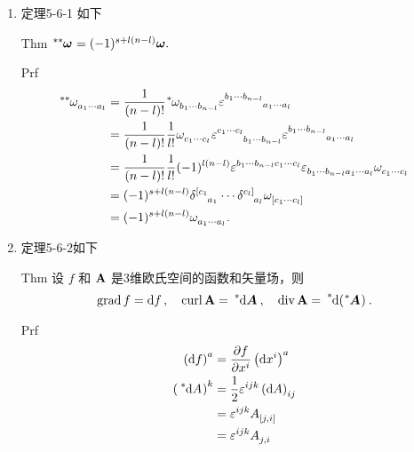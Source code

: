 \begin{xiti}
	\begin{zm}
		\begin{enumerate}
			\item 定理5-6-1 如下
			\begin{yl}{Thm}
				$\tensor[^*^*]{\bm{\omega}}{} = (-1)^{s+l(n-l)} \bm{\omega}. $
			\end{yl}
		    \begin{yl}{Prf}
		    	\begin{align*}
		    	\tensor[^*^*]{\omega}{_{a_1 \cdots a_l}} &= \frac{1}{(n-l)!} \tensor[^*]{\omega}{_{b_1 \cdots b_{n-l}}} \tensor{\varepsilon}{^{b_1 \cdots b_{n-l}}_{a_1 \cdots a_l}} \\
		    	&= \frac{1}{(n-l)!} \frac{1}{l!} \tensor{\omega}{_{c_1 \cdots c_l}} \tensor{\varepsilon}{^{c_1 \cdots c_l}_{b_1 \cdots b_{n-l}}} \tensor{\varepsilon}{^{b_1 \cdots b_{n-l}}_{a_1 \cdots a_l}}\\
		    	&= \frac{1}{(n-l)!} \frac{1}{l!} (-1)^{l(n-l)} \tensor{\varepsilon}{^{b_1 \cdots b_{n-l} c_1 \cdots c_l}} \tensor{\varepsilon}{_{b_1 \cdots b_{n-l}a_1 \cdots a_l}} \tensor{\omega}{_{c_1 \cdots c_l}}\\
		    	&= (-1)^{s+l(n-l)} \tensor{\delta}{^{[c_1}_{a_1}} \cdots \tensor{\delta}{^{c_l]}_{a_l}} \tensor{\omega}{_{[c_1\cdots c_l]}}\\
		    	&= (-1)^{s+l(n-l)} \tensor{\omega}{_{a_1\cdots a_l}}.
		    	\end{align*}
		    \end{yl}
	        \item 定理5-6-2如下
	        \begin{yl}{Thm}
	        	设 $f$ 和 $\vb{A}$ 是3维欧氏空间的函数和矢量场，则
	        	\[ \ggrad f=\dd{f}\qc \ccurl \myvec{A} = \tensor[^*]{\dd{\bm{A}}}{} \qc \ddiv \myvec{A} = \tensor[^*]{\dd(\tensor[^*]{\bm{A}}{})}{}. \]
	        \end{yl}
            \begin{yl}{Prf}
            	\begin{align*}
            	\tensor{\left(\dd{f}\right)}{^a}&= \pdv{f}{x^i} \tensor{\left(\dd{x^i}\right)}{^a}\\
            	\tensor{\left(\tensor[^*]{\dd{A}}{}\right)}{^k}&= \frac{1}{2} \tensor{\varepsilon}{^i^j^k} \tensor{\left(\dd{A}\right)}{_i_j}\\
            	&= \tensor{\varepsilon}{^i^j^k}  \tensor{A}{_{[j,i]}}\\
            	&= \tensor{\varepsilon}{^i^j^k} \tensor{A}{_{j,i}}\\

\end{align*}
\end{yl}
\end{enumerate}
\end{zm}
\end{xiti}
